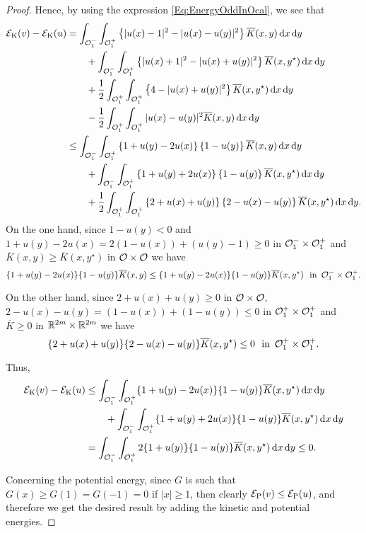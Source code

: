 \begin{proof}
Hence, by using the expression \eqref{Eq:EnergyOddInOcal}, we see that
\begin{align*}
\mathcal{E}_\mathrm{K}(v) - \mathcal{E}_\mathrm{K}(u) &= \int_{\mathcal{O}_1^-} \int_{\mathcal{O}_1^+} \left\{|u(x) - 1|^2 - |u(x) - u(y)|^2 \right\} \overline{K}(x,y) \,\mathrm{d} x \,\mathrm{d} y \\
&\quad \quad+ \int_{\mathcal{O}_1^-} \int_{\mathcal{O}_1^+} \left\{|u(x) + 1|^2 - |u(x) + u(y)|^2 \right\} \overline{K}(x,y^\star) \,\mathrm{d} x \,\mathrm{d} y \\
&\quad \quad+ \frac{1}{2}\int_{\mathcal{O}_1^+} \int_{\mathcal{O}_1^+} \left\{4 - |u(x) + u(y)|^2 \right\} \overline{K}(x,y^\star) \,\mathrm{d} x \,\mathrm{d} y \\
&\quad \quad- \frac{1}{2}\int_{\mathcal{O}_1^+} \int_{\mathcal{O}_1^+} |u(x) - u(y)|^2 \overline{K}(x,y) \,\mathrm{d} x \,\mathrm{d} y \\
&\leq \int_{\mathcal{O}_1^-} \int_{\mathcal{O}_1^+} \left\{ 1+u(y)-2u(x)\right \} \left\{ 1-u(y) \right \} \overline{K}(x,y) \,\mathrm{d} x \,\mathrm{d} y \\
&\quad \quad+ \int_{\mathcal{O}_1^-} \int_{\mathcal{O}_1^+} \left \{1+u(y)+2u(x)\right \} \left\{ 1-u(y)\right \} \overline{K}(x,y^\star) \,\mathrm{d} x \,\mathrm{d} y \\
&\quad \quad+ \frac{1}{2}\int_{\mathcal{O}_1^+} \int_{\mathcal{O}_1^+} \left \{ 2+u(x)+u(y)\right \} \left\{ 2-u(x)-u(y) \right \} \overline{K}(x,y^\star) \,\mathrm{d} x \,\mathrm{d} y. \\
\end{align*}
On the one hand, since $1-u(y)<0$ and $1+u(y)-2u(x) = 2 (1-u(x))+(u(y)-1) \geq 0$ in $\mathcal{O}_1^-\times\mathcal{O}_1^+$ and $\overline{K}(x,y)\geq \overline{K}(x,y^\star)$  in $\mathcal{O} \times \mathcal{O}$ we have
$$ 
\{1+u(y)-2u(x)\}\{1-u(y)\} \overline{K}(x,y) \leq  \{ 1+u(y)-2u(x) \}\{ 1-u(y) \} \overline{K}(x,y^\star) \,\,\,\, \text{in} \,\,\, \mathcal{O}_1^-\times\mathcal{O}_1^+. $$

On the other hand, since $2+u(x)+u(y)\geq 0$ in $\mathcal{O} \times \mathcal{O}$, $2-u(x)-u(y) = (1-u(x))+(1-u(y)) \leq 0$ in $\mathcal{O}_1^+\times\mathcal{O}_1^+$ and $\overline{K}\geq 0$ in $\mathbb{R}^{2m}\times\mathbb{R}^{2m}$ we have
$$
\{2+u(x)+u(y)\}\{2-u(x)-u(y)\} \overline{K}(x,y^\star) \leq 0 \,\,\,\, \text{in} \,\,\, \mathcal{O}_1^+\times\mathcal{O}_1^+. $$

Thus,
\begin{align*}
\mathcal{E}_\mathrm{K}(v) - \mathcal{E}_\mathrm{K}(u) &\leq \int_{\mathcal{O}_1^-} \int_{\mathcal{O}_1^+} \{ 1+u(y)-2u(x) \} \{ 1-u(y) \} \overline{K}(x,y^\star) \,\mathrm{d} x \,\mathrm{d} y \\
&\quad \quad + \int_{\mathcal{O}_1^-} \int_{\mathcal{O}_1^+}  \{ 1+u(y)+2u(x) \}\{ 1-u(y) \} \overline{K}(x,y^\star) \,\mathrm{d} x \,\mathrm{d} y \\
&= \int_{\mathcal{O}_1^-} \int_{\mathcal{O}_1^+} 2 \{ 1+u(y) \} \{ 1-u(y) \} \overline{K}(x,y^\star) \,\mathrm{d} x \,\mathrm{d} y \leq 0.
\end{align*}

Concerning the potential energy, since $G$ is such that $G(x)\geq G(1) = G(-1) = 0$ if $|x|\geq 1$, then clearly $\mathcal{E}_\mathrm{P}(v) \leq \mathcal{E}_\mathrm{P}(u)$, and therefore we get the desired result by adding the kinetic and potential energies.
\end{proof}

